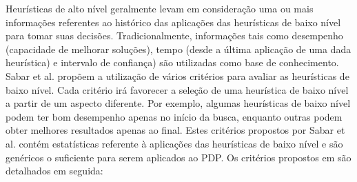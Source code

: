 Heurísticas de alto nível geralmente levam em consideração uma ou mais informações referentes ao histórico das aplicações das heurísticas de baixo nível para tomar suas decisões. Tradicionalmente, informações tais como desempenho (capacidade de melhorar soluções), tempo (desde a última aplicação de uma dada heurística) e intervalo de confiança) são utilizadas como base de conhecimento.  Sabar et al. \cite{sabar2015automatic} propõem a utilização de vários critérios para avaliar as heurísticas de baixo nível. Cada critério irá favorecer a seleção de uma heurística de baixo nível a partir de um aspecto diferente. Por exemplo, algumas heurísticas de baixo nível podem ter bom desempenho apenas no início da busca, enquanto outras podem obter melhores resultados apenas ao final. Estes critérios propostos por Sabar et al. contém estatísticas referente à aplicações das heurísticas de baixo nível e são genéricos o suficiente para serem aplicados ao PDP. Os critérios propostos em \cite{sabar2015automatic} são detalhados em seguida:


